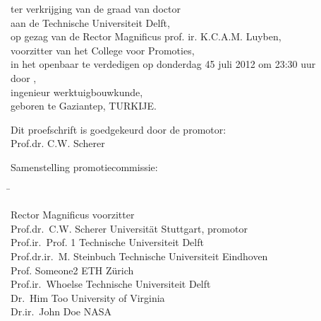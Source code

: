 \smallskip{}


\begin{center}
ter verkrijging van de graad van doctor\\
aan de Technische Universiteit Delft,\\
op gezag van de Rector Magnificus prof. ir. K.C.A.M. Luyben,\\
voorzitter van het College voor Promoties,\\
in het openbaar te verdedigen op donderdag 45 juli 2012 om 23:30 uur\\
door \theauthor,\\
ingenieur werktuigbouwkunde,\\
geboren te Gaziantep, TURKIJE.
\end{center}

\newpage %
\thispagestyle{empty}

\noindent Dit proefschrift is goedgekeurd door de promotor:\\
Prof.dr. C.W. Scherer\\
\bigskip{}

\noindent Samenstelling promotiecommissie:
\smallskip{}
\noindent
\begin{flushleft}\begin{tabbing}
\hspace*{70mm}\=\kill

Rector Magnificus \> voorzitter\\
Prof.dr.\ C.W. Scherer \> Universit\"{a}t Stuttgart, promotor\\
Prof.ir.\ Prof. 1 \> Technische Universiteit Delft\\
Prof.dr.ir.\ M. Steinbuch  \> Technische Universiteit Eindhoven\\
Prof. Someone2 \> ETH Z\"{u}rich\\
Prof.ir.\ Whoelse \> Technische Universiteit Delft \\
Dr.\ Him Too \> University of Virginia \\
Dr.ir.\ John Doe\> NASA\\
\end{tabbing}\end{flushleft}

\vspace*{\fill}

